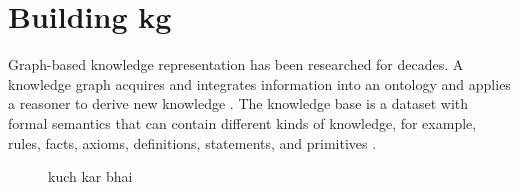 \chapter{Building \acrfull{kg}}

Graph-based knowledge representation has been researched for decades.
A knowledge graph acquires and integrates information into an ontology and applies a reasoner to derive new knowledge \parencite{LisaEhrlinger}.
The knowledge base is a dataset with formal semantics that can contain different kinds of knowledge, for example, rules, facts, axioms, definitions, statements, and primitives \parencite{Davies.2008cop.2006}.


\begin{figure}[h!]
    \centering
    
    \caption{kuch kar bhai}
    \label{fig:440}
\end{figure}


